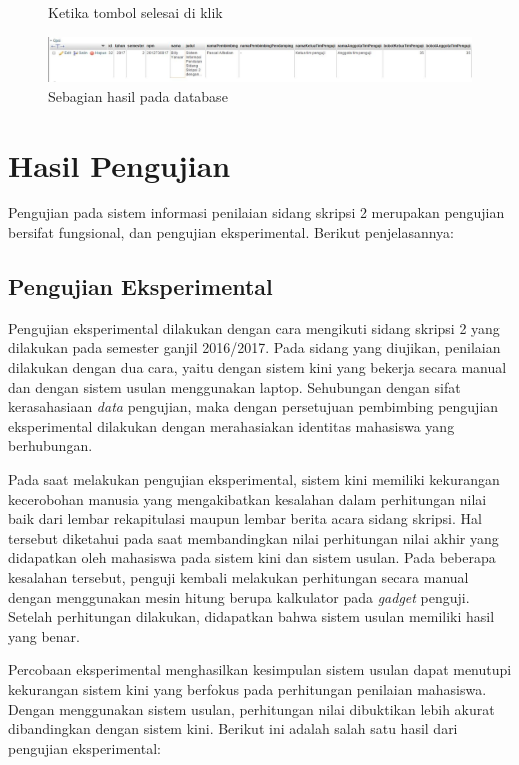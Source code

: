 \begin{enumerate}
\begin{figure}[H]
			\caption{Ketika tombol selesai di klik}
			\label{fig:selesaiisi}
		\end{figure}
		\begin{figure}[H]
			\centering
			\includegraphics[scale=0.5]{Gambar/hasildatabase}
			\caption{Sebagian hasil pada database}
			\label{fig:hasildatabase}
		\end{figure}
	\end{enumerate}
	
\section{Hasil Pengujian}
\label{sec:hasilUji}

	Pengujian pada sistem informasi penilaian sidang skripsi 2 merupakan pengujian bersifat fungsional, dan pengujian eksperimental. Berikut penjelasannya:
	
	\subsection{Pengujian Eksperimental}
	\label{sub: PEksperimen}
	
	Pengujian eksperimental dilakukan dengan cara mengikuti sidang skripsi 2 yang dilakukan pada semester ganjil 2016/2017. Pada sidang yang diujikan, penilaian dilakukan dengan dua cara, yaitu dengan sistem kini yang bekerja secara manual dan dengan sistem usulan menggunakan laptop. Sehubungan dengan sifat kerasahasiaan \textit{data} pengujian, maka dengan persetujuan pembimbing pengujian eksperimental dilakukan dengan merahasiakan identitas mahasiswa yang berhubungan.
	
	Pada saat melakukan pengujian eksperimental, sistem kini memiliki kekurangan kecerobohan manusia yang mengakibatkan kesalahan dalam perhitungan nilai baik dari lembar rekapitulasi maupun lembar berita acara sidang skripsi. Hal tersebut diketahui pada saat membandingkan nilai perhitungan nilai akhir yang didapatkan oleh mahasiswa pada sistem kini dan sistem usulan. Pada beberapa kesalahan tersebut, penguji kembali melakukan perhitungan secara manual dengan menggunakan mesin hitung berupa kalkulator pada \textit{gadget} penguji. Setelah perhitungan dilakukan, didapatkan bahwa sistem usulan memiliki hasil yang benar.
	
	Percobaan eksperimental menghasilkan kesimpulan sistem usulan dapat menutupi kekurangan sistem kini yang berfokus pada perhitungan penilaian mahasiswa. Dengan menggunakan sistem usulan, perhitungan nilai dibuktikan lebih akurat dibandingkan dengan sistem kini. Berikut ini adalah salah satu hasil dari pengujian eksperimental:
	
